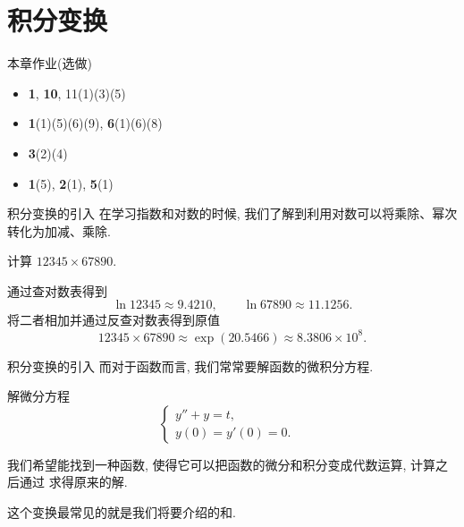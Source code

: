 \part{积分变换}


\begin{frame}[<*>]{本章作业(选做)}
\begin{itemize}
\item {} \textbf{1}, \textbf{10}, {11}(1)(3)(5)
\item {} \textbf{1}(1)(5)(6)(9), \textbf{6}(1)(6)(8)
\item {} \textbf{3}(2)(4)
\item {} \textbf{1}(5), \textbf{2}(1), \textbf{5}(1)
\end{itemize}
\end{frame}


\begin{frame}{积分变换的引入}
\onslide<+->
在学习指数和对数的时候, 我们了解到利用对数可以将乘除、幂次转化为加减、乘除.
\begin{example}
计算 $12345\times 67890$.
\end{example}
\begin{solution}
通过查对数表得到
\[\ln 12345\approx 9.4210,\qquad\ln 67890\approx 11.1256.\]
\onslide<+->
将二者相加并通过反查对数表得到原值
\[12345\times 67890\approx \exp(20.5466)\approx 8.3806\times 10^8.\]
\end{solution}
\end{frame}


\begin{frame}{积分变换的引入}
\onslide<+->
而对于函数而言, 我们常常要解函数的微积分方程.
\begin{example}
解微分方程
	\[\begin{cases}
		y''+y=t	,& \\
		y(0)=y'(0)=0.&
	\end{cases}\]
\end{example}
\begin{solution}
\indent
我们希望能找到一种函数, 使得它可以把函数的微分和积分变成代数运算, 计算之后通过 求得原来的解.

\indent
\onslide<+->
这个变换最常见的就是我们将要介绍的和.
\end{solution}
\end{frame}

